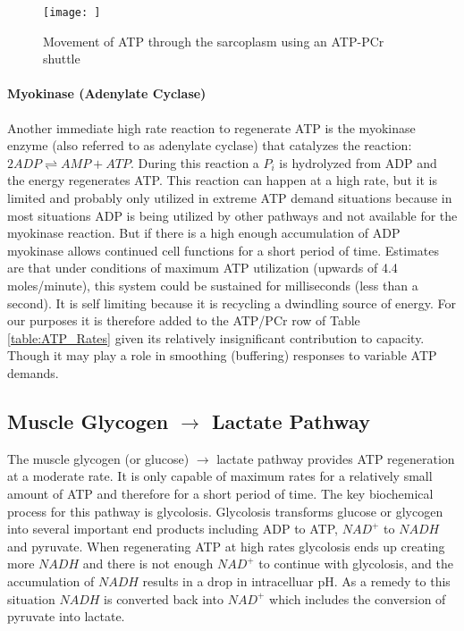 \begin{figure}[h!]
    \centering
    \texttt{[image: ]}
    \caption{Movement of ATP through the sarcoplasm using an ATP-PCr shuttle}
    \label{fig:PCr}
\end{figure}

\paragraph{Myokinase (Adenylate Cyclase)}

Another immediate high rate reaction to regenerate ATP is the myokinase enzyme (also referred to as adenylate cyclase) that catalyzes the reaction: $2ADP \rightleftharpoons AMP + ATP$. During this reaction a $P_i$ is hydrolyzed from ADP and the energy regenerates ATP. This reaction can happen at a high rate, but it is limited and probably only utilized in extreme ATP demand situations because in most situations ADP is being utilized by other pathways and not available for the myokinase reaction. But if there is a high enough accumulation of ADP myokinase allows continued cell functions for a short period of time. Estimates are that under conditions of maximum ATP utilization (upwards of 4.4 moles/minute), this system could be sustained for milliseconds (less than a second). It is self limiting because it is recycling a dwindling source of energy. For our purposes it is therefore added to the ATP/PCr row of Table \ref{table:ATP_Rates} given its relatively insignificant contribution to capacity. Though it may play a role in smoothing (buffering) responses to variable ATP demands.

\subsection{Muscle Glycogen $\rightarrow$ Lactate Pathway}

The muscle glycogen (or glucose) $\rightarrow$ lactate pathway provides ATP regeneration at a moderate rate. It is only capable of maximum rates for a relatively small amount of ATP and therefore for a short period of time. The key biochemical process for this pathway is glycolosis. 
Glycolosis transforms glucose or glycogen into several important end products including ADP to ATP, $NAD^+$ to $NADH$ and pyruvate. When regenerating ATP at high rates glycolosis ends up creating more $NADH$ and there is not enough $NAD^+$ to continue with glycolosis, and the accumulation of $NADH$ results in a drop in intracelluar pH. As a remedy to this situation $NADH$ is converted back into $NAD^+$ which includes the conversion of pyruvate into lactate.


